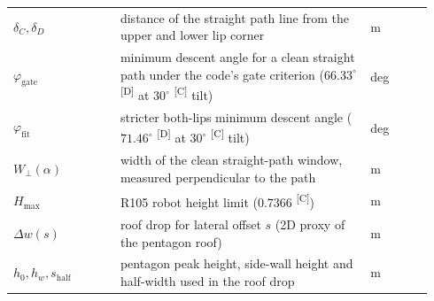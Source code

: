 \documentclass[11pt]{article}
\makeatletter
\DeclareRobustCommand{\provtag}[1]{%
  \ifmmode\text{\provtag@text{#1}}\else\provtag@text{#1}\fi}
\newcommand{\provtag@text}[1]{%
  \textsuperscript{\textsf{\upshape\scriptsize\color@grey[#1]}}}
\newcommand{\color@grey}[1]{#1}
\newcommand{\color@grey}[1]{\pdfliteral{0.45 g}#1\pdfliteral{0 g}}
\DeclareRobustCommand{\confirmed}{\provtag{C}}
\DeclareRobustCommand{\derived}{\provtag{D}}
\makeatother
\begin{document}
\begin{table}[p]
\begin{tabular}{@{}p{0.24\linewidth}p{0.56\linewidth}p{0.14\linewidth}@{}}
  $\delta_C,\delta_D$ & distance of the straight path line from the upper and lower lip corner & m \\
  $\varphi_{\mathrm{gate}}$ & minimum descent angle for a clean straight path under the code's gate criterion ($66.33^\circ$\derived{} at $30^\circ$\confirmed{} tilt) & deg \\
  $\varphi_{\mathrm{fit}}$ & stricter both-lips minimum descent angle ($71.46^\circ$\derived{} at $30^\circ$\confirmed{} tilt) & deg \\
  $W_\perp(\alpha)$ & width of the clean straight-path window, measured perpendicular to the path & m \\
  $H_{\max}$ & R105 robot height limit ($0.7366$\confirmed) & m \\
  $\Delta w(s)$ & roof drop for lateral offset $s$ (2D proxy of the pentagon roof) & m \\
  $h_0,h_w,s_{\mathrm{half}}$ & pentagon peak height, side-wall height and half-width used in the roof drop & m \\
  \bottomrule
\end{tabular}
\end{table}
\end{document}
